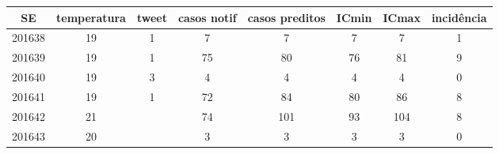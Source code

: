 \begin{tabular}{c|ccccccc}
  \hline
SE & temperatura & tweet & casos notif & casos preditos & ICmin & ICmax & incidência \\ 
  \hline
201638 & 19 & 1 & 7 & 7 & 7 & 7 & 1 \\ 
  201639 & 19 & 1 & 75 & 80 & 76 & 81 & 9 \\ 
  201640 & 19 & 3 & 4 & 4 & 4 & 4 & 0 \\ 
  201641 & 19 & 1 & 72 & 84 & 80 & 86 & 8 \\ 
  201642 & 21 &  & 74 & 101 & 93 & 104 & 8 \\ 
  201643 & 20 &  & 3 & 3 & 3 & 3 & 0 \\ 
   \hline
\end{tabular}
